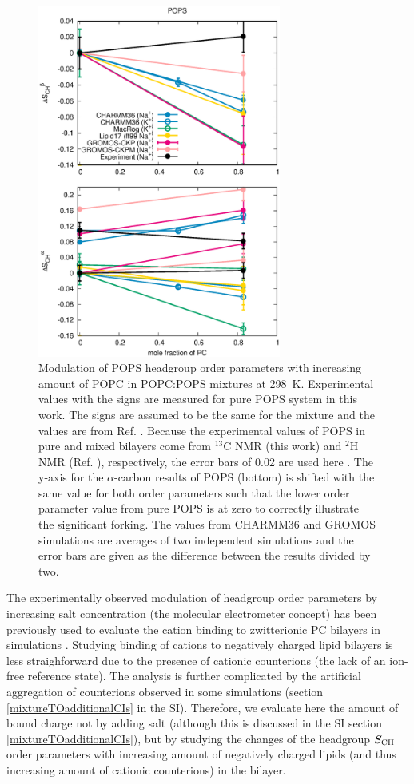 \documentclass[journal=jpcbfk,manuscript=article]{achemso}
\begin{document}
\begin{figure}[!tb]
  \centering
  \includegraphics[width=8.0cm]{../Figs/HGorderparametersPSvsPC.eps}
  \caption{\label{HGorderparametersPSvsPC}
    Modulation of POPS headgroup order parameters with increasing amount of POPC in POPC:POPS mixtures at 298~K.
    Experimental values with the signs are measured for pure POPS system in this work.
    The signs are assumed to be the same for the mixture and the values are from Ref. .
    Because the experimental values of POPS in pure and mixed bilayers come from $^{13}$C NMR (this work) and $^2$H NMR (Ref. ), respectively,
    the error bars of 0.02 are used here \cite{botan15,ollila16}.
    The y-axis for the $\alpha$-carbon results of POPS (bottom) is shifted
    with the same value for both order parameters such that the lower order
    parameter value from pure POPS is at zero to correctly illustrate the significant forking.
    The values from CHARMM36 and GROMOS simulations are averages of two independent simulations and
    the error bars are given as the difference between the results divided by two. 
  }
\end{figure}



The experimentally observed modulation of headgroup order parameters
by increasing salt concentration (the molecular electrometer concept) has been previously used to evaluate the cation binding to zwitterionic PC bilayers in simulations \cite{catte16}.
Studying binding of cations to negatively charged lipid bilayers is less straighforward due to the presence of cationic
counterions (the lack of an ion-free reference state). The analysis is further complicated by the artificial aggregation of counterions
observed in some simulations (section \ref{mixtureTOadditionalCIs} in the SI).
Therefore, we evaluate here the amount of bound charge not by adding salt
(although this is discussed in the SI section \ref{mixtureTOadditionalCIs}),
but by studying the changes of the headgroup $S_{\rm CH}$ order parameters with increasing amount of
negatively charged lipids (and thus increasing amount of cationic counterions) in the bilayer.
\end{document}

